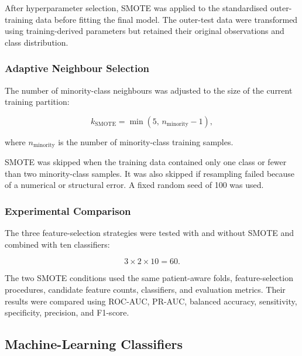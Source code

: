\documentclass[12pt,twocolumn]{article}
\begin{document}
After hyperparameter selection, SMOTE was applied to the standardised
outer-training data before fitting the final model. The outer-test data
were transformed using training-derived parameters but retained their
original observations and class distribution.

\subsubsection{Adaptive Neighbour Selection}
\label{subsubsec:adaptive_smote}

The number of minority-class neighbours was adjusted to the size of the
current training partition:

\begin{equation}
k_{\mathrm{SMOTE}}
=
\min
\left(
5,\,
n_{\mathrm{minority}}-1
\right),
\label{eq:adaptive_smote_neighbours}
\end{equation}

where \(n_{\mathrm{minority}}\) is the number of minority-class training
samples.

SMOTE was skipped when the training data contained only one class or
fewer than two minority-class samples. It was also skipped if
resampling failed because of a numerical or structural error. A fixed
random seed of 100 was used.

\subsubsection{Experimental Comparison}
\label{subsubsec:smote_comparison_design}

The three feature-selection strategies were tested with and without
SMOTE and combined with ten classifiers:

\begin{equation}
3 \times 2 \times 10 = 60.
\label{eq:smote_experimental_grid}
\end{equation}

The two SMOTE conditions used the same patient-aware folds,
feature-selection procedures, candidate feature counts, classifiers,
and evaluation metrics. Their results were compared using ROC-AUC,
PR-AUC, balanced accuracy, sensitivity, specificity, precision, and
F1-score.









\subsection{Machine-Learning Classifiers}
\label{subsec:classifiers}
\end{document}
